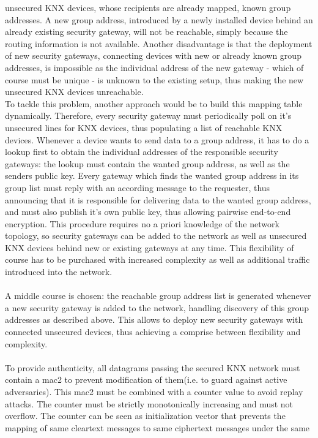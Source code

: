 unsecured KNX devices, whose recipients are already mapped, known group addresses. A new group address, introduced by a newly installed device behind
an already existing security gateway, will not be reachable, simply because the routing information is not available. 
Another disadvantage is that the deployment of new
security gateways, connecting devices with new or already known group addresses, is impossible as the individual address of the new gateway - which of
course must be unique - is unknown to the existing setup, thus making the new unsecured KNX devices unreachable.
\\
To tackle this problem, another approach would be to build this mapping table dynamically. Therefore, every security gateway must periodically poll
on it's unsecured lines for KNX devices, thus populating a list of reachable KNX devices. Whenever a 
device wants to send data to a group address, it has to do a lookup first to obtain the individual addresses of the responsible security gateways: the lookup
must contain the wanted group address, as well as the senders public key.
Every 
gateway which finds the wanted group address in its group list must reply with an according message to the requester, thus announcing that it is responsible
for delivering data to the wanted group address, and must also publish it's own public key, thus allowing pairwise end-to-end encryption.
This procedure requires no a priori knowledge of
the network topology, so security gateways can be added to the network as well as unsecured KNX devices behind new or existing gateways at any time. This
flexibility of course has to be purchased with increased complexity as well as additional traffic introduced into the network.
\\
\\
A middle course is chosen: the reachable group address list is generated whenever a new security gateway is added to the network,
 handling discovery of this group addresses as described
above. This allows to deploy new security gateways with connected unsecured devices, thus achieving a comprise between flexibility and complexity. 
\\
\\
To provide authenticity, all datagrams passing the secured KNX network must contain a \gls{mac2} to prevent modification of them(i.e. to guard against active
adversaries). This \gls{mac2} must be combined with a counter value to avoid replay attacks. The counter must be strictly monotonically increasing and must not overflow.
The counter can be seen as initialization vector that prevents the mapping of same cleartext messages to same ciphertext messages under the same
